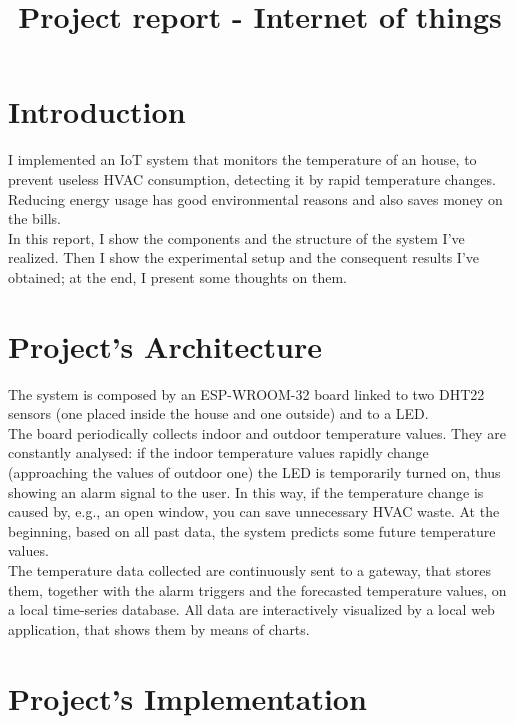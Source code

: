 \documentclass[conference]{IEEEtran}
\begin{document}
\title{Project report - Internet of things}

\author{
}

\maketitle


\section{Introduction}
I implemented an IoT system that monitors the temperature of an house, to prevent useless HVAC consumption, detecting it by rapid temperature changes. Reducing energy usage has good environmental reasons and also saves money on the bills.\\
In this report, I show the components and the structure of the system I've realized. Then I show the experimental setup and the consequent results I've obtained; at the end, I present some thoughts on them.


\section{Project’s Architecture}
The system is composed by an ESP-WROOM-32 board linked to two DHT22 sensors (one placed inside the house and one outside) and to a LED.\\
The board periodically collects indoor and outdoor temperature values. They are constantly analysed: if the indoor temperature values rapidly change (approaching the values of outdoor one) the LED is temporarily turned on, thus showing an alarm signal to the user. In this way, if the temperature change is caused by, e.g., an open window, you can save unnecessary HVAC waste. At the beginning, based on all past data, the system predicts some future temperature values.\\
The temperature data collected are continuously sent to a gateway, that stores them, together with the alarm triggers and the forecasted temperature values, on a local time-series database. All data are interactively visualized by a local web application, that shows them by means of charts.


\section{Project’s Implementation}
\end{document}
